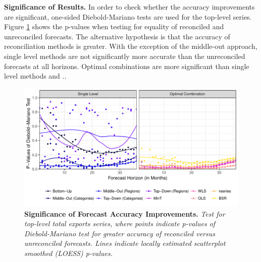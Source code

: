 \documentclass[a4paper,fleqn,11pt]{article}
\begin{document}
\noindent\textbf{Significance of Results.} In order to check whether the accuracy improvements are significant, one-sided Diebold-Mariano tests are used for the top-level series. Figure \ref{fig:dmtest} shows the p-values when testing for equality of reconciled and unreconciled forecasts. The alternative hypothesis is that the accuracy of reconciliation methods is greater. With the exception of the middle-out approach, single level methods are not significantly more accurate than the unreconciled forecasts at all horizons. Optimal combinations are more significant than single level methods and .. 

\begin{figure}[H]
	\includegraphics[width=\textwidth]{fig/fig_dm}
	\caption[Significance of Forecast Accuracy Improvements]{\textbf{Significance of Forecast Accuracy Improvements.} \small{\textit{Test for top-level total exports series, where points indicate p-values of Diebold-Mariano test for greater accuracy of reconciled versus unreconciled forecasts. Lines indicate locally estimated scatterplot smoothed (LOESS) p-values.}}} \label{fig:dmtest}
\end{figure}
\end{document}
